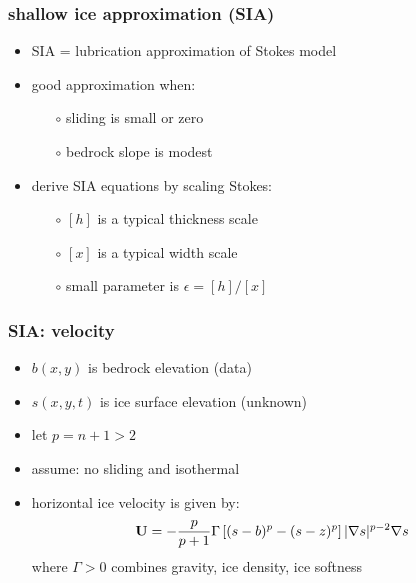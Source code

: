 \documentclass[hide notes,intlimits]{beamer}
\newcommand{\eps}{\epsilon}
\begin{document}
\begin{frame}
  \frametitle{shallow ice approximation (SIA)}

\begin{itemize}
\item SIA = lubrication approximation of Stokes model
\item good approximation when:
  \begin{itemize}
  \item[$\circ$] sliding is small or zero
  \item[$\circ$] bedrock slope is modest
  \end{itemize}
\item derive SIA equations by scaling Stokes:
  \begin{itemize}
  \item[$\circ$] $[h]$ is a typical thickness scale
  \item[$\circ$] $[x]$ is a typical width scale
  \item[$\circ$] small parameter is $\eps = [h] / [x]$
  \end{itemize}
\end{itemize}
\end{frame}


\begin{frame}
  \frametitle{SIA: velocity}
 
\begin{itemize}
\item $b(x,y)$ is bedrock elevation (data)
\item $s(x,y,t)$ is ice surface elevation (unknown)
\item let $p=n+1>2$
\item assume: no sliding and isothermal
\item horizontal ice velocity is given by: 
  $${\bf U}  =  - \frac{p}{p+1} \Gamma \left[ (s-b)^p - (s - z)^p  \right] 
|\nabla s |^{p-2} \nabla s$$
where $\Gamma > 0$ combines gravity, ice density, ice softness
\end{itemize}
\end{frame}
\end{document}
